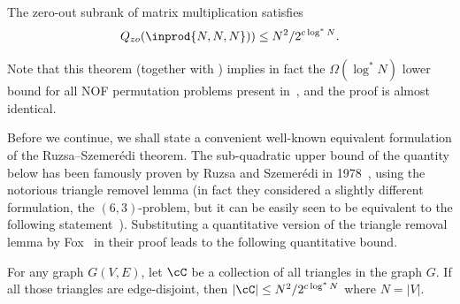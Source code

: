 \begin{theorem}
\label{thm:subrank-triangle-lb}
The zero-out subrank of matrix multiplication satisfies
\begin{equation*}
    Q_{zo}(\inprod{N,N,N})) \leq N^{2}/2^{c \log^* N}.
\end{equation*}
\end{theorem}

Note that this theorem (together with ) implies in fact the $\Omega(\log^* N)$ lower bound for all NOF permutation problems present in~\cite{LPS17}, and the proof is almost identical.



Before we continue, we shall state a convenient well-known equivalent formulation of the Ruzsa–Szemerédi theorem. The sub-quadratic upper bound of the quantity below has been famously proven by Ruzsa and Szemerédi in 1978~\cite{RS78}, using the notorious triangle removel lemma (in fact they considered a slightly different formulation, the $(6,3)$-problem, but it can be easily seen to be equivalent to the following statement~\cite{CEMS91}). Substituting a quantitative version of the triangle removal lemma by Fox~\cite{F11} in their proof leads to the following quantitative bound.  
\begin{theorem}
\label{thm:ruzsa-szemeredi}
    For any graph $G(V,E)$, let $\cC$ be a collection of all triangles in the graph $G$. If all those triangles are edge-disjoint, then $|\cC| \leq N^2/2^{c \log^* N}$ where $N = |V|$.
\end{theorem}

